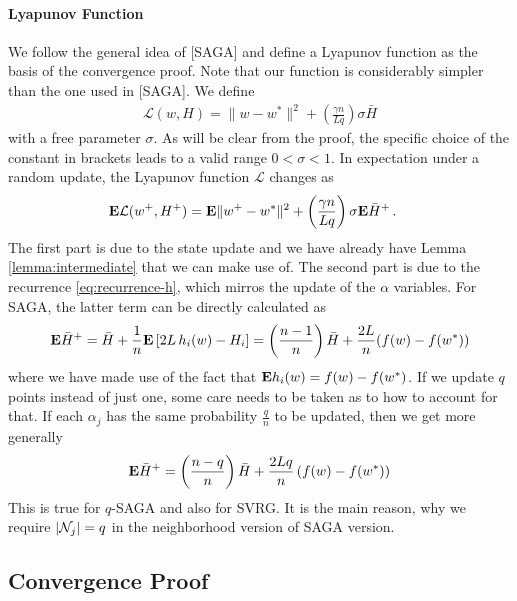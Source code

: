 \documentclass{article}
\newcommand{\E}{{\bf E}}
\begin{document}
 \paragraph{Lyapunov Function} 
We follow the general idea of [SAGA] and define a Lyapunov function as the basis of the convergence proof. Note that our function is considerably simpler than the one used in [SAGA]. We  define 
\renewcommand{\L}{{\mathcal L}}
\begin{align}
\L(w,H) = \| w- w^*\|^2 + \left( \frac{\gamma n}{L q} \right) \sigma   \bar H 
\end{align}
with a free parameter $\sigma$. As will be clear from the proof, the specific choice of the constant in brackets leads to a valid range $0 < \sigma < 1$.  In expectation under a random update, the Lyapunov function $\L$ changes as
\begin{align}
\E \L(w^+,H^+) & = \E \| w^+ - w^*\|^2  + \left( \frac{\gamma n}{L q} \right) \sigma  \E \bar H^+ \,.
\nonumber
\end{align}
The first part is due to the state update and we have already have Lemma \ref{lemma:intermediate} that we can make use of. The second part is due to the recurrence \eqref{eq:recurrence-h}, which mirros the update of the $\alpha$ variables. For SAGA, the latter term can be directly calculated as
\begin{align}
\E \bar H^+ = \bar H + \frac 1n \E \left[ 2L\, h_i(w) - H_i \right]
= \left( \frac{n-1}{n} \right) \bar H + \frac{2L}{n} (f(w)-f(w^*))
\end{align}
where we have made use of the fact that $\E h_i(w) = f(w)-f(w^*)$.  If we update $q$ points instead of just one, some care needs to be taken as to how to account for that. If each $\alpha_j$ has the same probability $\frac qn$ to be updated, then we get more generally 
\begin{align}
\E \bar H^+ = \left( \frac{n-q}{n} \right) \bar H + \frac{2Lq}{n} \, (f(w) - f(w^*))
\label{eq:h-recurrence}
\end{align}
This is true for $q$-SAGA and also for SVRG. It is the main reason, why we require $|{\cal N}_j| =q$ in the neighborhood version of SAGA version.


\subsection{Convergence Proof}
\end{document}
